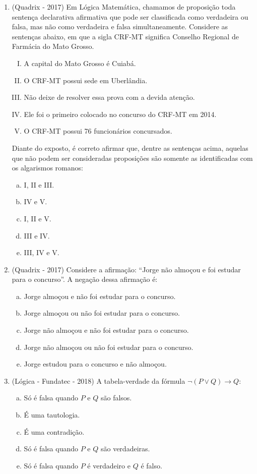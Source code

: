 \begin{enumerate}
\item (Quadrix - 2017) Em Lógica Matemática, chamamos de proposição toda sentença declarativa afirmativa que pode ser classificada como verdadeira ou falsa, mas não como verdadeira e falsa simultaneamente. Considere as sentenças abaixo, em que a sigla CRF-MT significa Conselho Regional de Farmácia do Mato Grosso.
\begin{enumerate}[I.]
\item A capital do Mato Grosso é Cuiabá.
\item O CRF-MT possui sede em Uberlândia.
\item Não deixe de resolver essa prova com a devida atenção.
\item Ele foi o primeiro colocado no concurso do CRF-MT em 2014.
\item O CRF-MT possui 76 funcionários concursados.
\end{enumerate}
Diante do exposto, é correto afirmar que, dentre as sentenças acima, aquelas que não podem ser consideradas proposições são somente as identificadas com os algarismos romanos:
\begin{multicols}{2}
\begin{enumerate}[a)]
\item I, II e III. 
\item IV e V.
\item I, II e V.
\item III e IV.
\item III, IV e V.
\end{enumerate}
\end{multicols}

\item (Quadrix - 2017) Considere a afirmação: “Jorge não almoçou e foi estudar para o concurso”. A negação dessa afirmação é: 
\begin{enumerate}[a)]
\item Jorge almoçou e não foi estudar para o concurso.
\item Jorge almoçou ou não foi estudar para o concurso.
\item Jorge não almoçou e não foi estudar para o concurso.
\item Jorge não almoçou ou não foi estudar para o concurso.
\item Jorge estudou para o concurso e não almoçou.
\end{enumerate}

\item (Lógica - Fundatec - 2018) A tabela-verdade da fórmula $\neg(P \lor Q) \rightarrow Q$:
\begin{enumerate}[a)]
\item Só é falsa quando $P$ e $Q$ são falsos.
\item É uma tautologia.
\item É uma contradição.
\item Só é falsa quando $P$ e $Q$ são verdadeiras.
\item Só é falsa quando $P$ é verdadeiro e $Q$ é falso.
\end{enumerate}


\end{enumerate}
